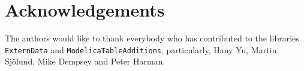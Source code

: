 \documentclass{modelica}
\newcommand{\modelica}[1]{\lstinline[language=modelica]|#1|}
\begin{document}




\section*{Acknowledgements}

The authors would like to thank everybody who has contributed to the libraries \modelica{ExternData} and \modelica{ModelicaTableAdditions}, particularly, Hany Yu, Martin Sjölund, Mike Dempsey and Peter Harman.

\printbibliography
\end{document}
